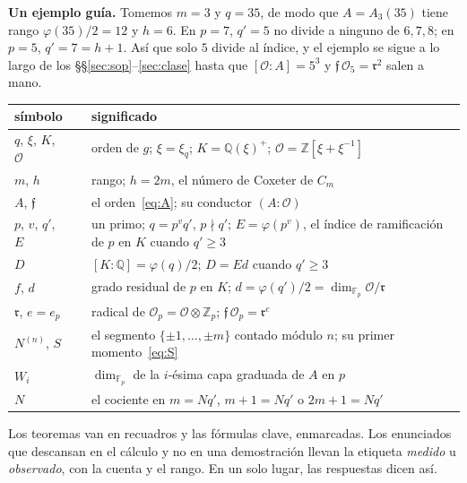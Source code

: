 \documentclass[11pt,a4paper]{article}
\theoremstyle{definition}
\newcommand{\ZZ}{\mathbb{Z}}
\newcommand{\QQ}{\mathbb{Q}}
\newcommand{\FF}{\mathbb{F}}
\newcommand{\cO}{\mathcal{O}}
\newcommand{\cf}{\mathfrak{f}}
\newcommand{\rad}{\mathfrak{r}}
\begin{document}
\noindent\textbf{Un ejemplo guía.} Tomemos $m=3$ y $q=35$, de modo que $A=A_3(35)$ tiene rango $\varphi(35)/2=12$ y
$h=6$. En $p=7$, $q'=5$ no divide a ninguno de $6,7,8$; en $p=5$, $q'=7=h+1$. Así que solo $5$ divide al índice, y el
ejemplo se sigue a lo largo de los \S\S\ref{sec:sop}--\ref{sec:clase} hasta que $[\cO:A]=5^3$ y $\cf\,\cO_5=\rad^2$
salen a mano.

\medskip
\begin{center}\small
{}
\begin{tabular}{llp{}}
\toprule
símbolo & & significado \\
\midrule
$q$, $\xi$, $K$, $\cO$ & & orden de $g$; $\xi=\xi_q$; $K=\QQ(\xi)^+$; $\cO=\ZZ[\xi+\xi^{-1}]$ \\
$m$, $h$ & & rango; $h=2m$, el número de Coxeter de $C_m$ \\
$A$, $\cf$ & & el orden~\eqref{eq:A}; su conductor $(A:\cO)$ \\
$p$, $v$, $q'$, $E$ & & un primo; $q=p^vq'$, $p\nmid q'$; $E=\varphi(p^v)$, el índice de ramificación de $p$ en $K$ cuando $q'\ge3$ \\
$D$ & & $[K:\QQ]=\varphi(q)/2$; $D=Ed$ cuando $q'\ge3$ \\
$f$, $d$ & & grado residual de $p$ en $K$; $d=\varphi(q')/2=\dim_{\FF_p}\cO/\rad$ \\
$\rad$, $e=e_p$ & & radical de $\cO_p=\cO\otimes\ZZ_p$; $\cf\,\cO_p=\rad^{e}$ \\
$N^{(n)}$, $S$ & & el segmento $\{\pm1,\dots,\pm m\}$ contado módulo $n$; su primer momento~\eqref{eq:S} \\
$W_i$ & & $\dim_{\FF_p}$ de la $i$-ésima capa graduada de $A$ en $p$ \\
$N$ & & el cociente en $m=Nq'$, $m+1=Nq'$ o $2m+1=Nq'$ \\
\bottomrule
\end{tabular}
\end{center}

\noindent Los teoremas van en recuadros y las fórmulas clave, enmarcadas. Los enunciados que descansan en el
cálculo y no en una demostración llevan la etiqueta \emph{medido} u \emph{observado}, con la cuenta y el rango. En
un solo lugar, las respuestas dicen así.
\end{document}

